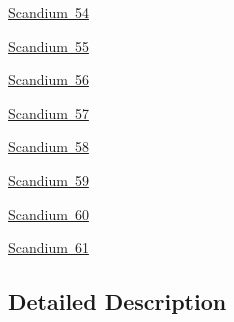 \begin{DoxyCompactItemize}
\item 
\mbox{\hyperlink{group___isotope_const-_scandium-_sc54}{Scandium 54}}
\item 
\mbox{\hyperlink{group___isotope_const-_scandium-_sc55}{Scandium 55}}
\item 
\mbox{\hyperlink{group___isotope_const-_scandium-_sc56}{Scandium 56}}
\item 
\mbox{\hyperlink{group___isotope_const-_scandium-_sc57}{Scandium 57}}
\item 
\mbox{\hyperlink{group___isotope_const-_scandium-_sc58}{Scandium 58}}
\item 
\mbox{\hyperlink{group___isotope_const-_scandium-_sc59}{Scandium 59}}
\item 
\mbox{\hyperlink{group___isotope_const-_scandium-_sc60}{Scandium 60}}
\item 
\mbox{\hyperlink{group___isotope_const-_scandium-_sc61}{Scandium 61}}
\end{DoxyCompactItemize}


\subsection{Detailed Description}
